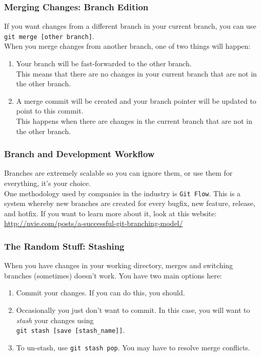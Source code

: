 \documentclass{lug}
\begin{document}
\begin{frame}
    \frametitle{Merging Changes: Branch Edition}
    If you want changes from a different branch in your current branch, you can use \texttt{git
    merge [other branch]}.\\

    When you merge changes from another branch, one of two things will happen\footnotemark:

    \begin{enumerate}
        \item Your branch will be fast-forwarded to the other branch.\\
            This means that there are no changes in your current branch that are not in the other
            branch.
        \item A merge commit will be created and your branch pointer will be updated to point to
            this commit.\\
            This happens when there are changes in the current branch that are not in the other
            branch.
    \end{enumerate}

\end{frame}

\begin{frame}
    \frametitle{Branch and Development Workflow}

    Branches are extremely scalable so you can ignore them, or use them for everything, it's your
    choice.\\

    One methodology used by companies in the industry is \texttt{Git Flow}. This is a system
    whereby new branches are created for every bugfix, new feature, release, and hotfix. If you want
    to learn more about it, look at this website:
    \url{http://nvie.com/posts/a-successful-git-branching-model/}
\end{frame}

\begin{frame}
    \frametitle{The Random Stuff: Stashing}

    When you have changes in your working directory, merges and switching branches (sometimes)
    doesn't work. You have two main options here:

    \begin{enumerate}
        \item Commit your changes. If you can do this, you should.
        \item Occasionally you just don't want to commit. In this case, you will want to
            \textit{stash} your changes using\\ \texttt{git stash [save [stash\_name]]}.
        \item To un-stash, use \texttt{git stash pop}. You may have to resolve merge conflicts.
    \end{enumerate}
\end{frame}
\end{document}
